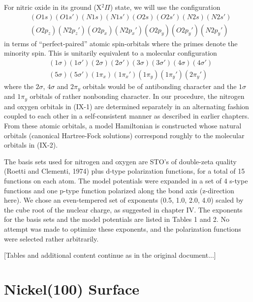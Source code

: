 \documentclass[12pt,letterpaper]{report}
\begin{document}
For nitric oxide in its ground (X$^2\Pi$) state, we will use the configuration
\begin{align}
&(O1s)(O1s')(N1s)(N1s')(O2s)(O2s')(N2s)(N2s')\nonumber\\
&(O2p_z)(N2p_z')(O2p_x)(N2p_x')(O2p_y)(O2p_y')(N2p_y')
\end{align}
in terms of ``perfect-paired'' atomic spin-orbitals where the primes denote the minority spin. This is unitarily equivalent to a molecular configuration
\begin{align}
&(1\sigma)(1\sigma')(2\sigma)(2\sigma')(3\sigma)(3\sigma')(4\sigma)(4\sigma')\nonumber\\
&(5\sigma)(5\sigma')(1\pi_x)(1\pi_x')(1\pi_y)(1\pi_y')(2\pi_y')
\end{align}
where the $2\sigma$, $4\sigma$ and $2\pi_y$ orbitals would be of antibonding character and the $1\sigma$ and $1\pi_y$ orbitals of rather nonbonding character. In our procedure, the nitrogen and oxygen orbitals in (IX-1) are determined separately in an alternating fashion coupled to each other in a self-consistent manner as described in earlier chapters. From these atomic orbitals, a model Hamiltonian is constructed whose natural orbitals (canonical Hartree-Fock solutions) correspond roughly to the molecular orbitals in (IX-2).

The basis sets used for nitrogen and oxygen are STO's of double-zeta quality (Roetti and Clementi, 1974) plus d-type polarization functions, for a total of 15 functions on each atom. The model potentials were expanded in a set of 4 s-type functions and one p-type function polarized along the bond axis (z-direction here). We chose an even-tempered set of exponents (0.5, 1.0, 2.0, 4.0) scaled by the cube root of the nuclear charge, as suggested in chapter IV. The exponents for the basis sets and the model potentials are listed in Tables 1 and 2. No attempt was made to optimize these exponents, and the polarization functions were selected rather arbitrarily.

[Tables and additional content continue as in the original document...]

\section{Nickel(100) Surface}
\end{document}
